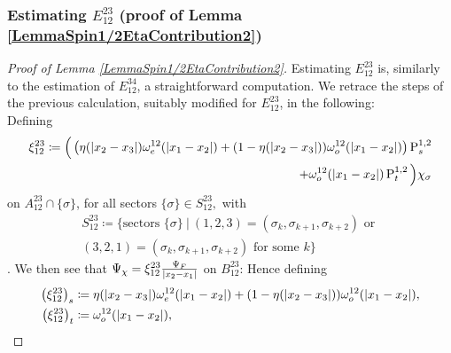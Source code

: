 \subsubsection{Estimating $ E_{12}^{23} $ (proof of Lemma \ref{LemmaSpin1/2EtaContribution2})}
\begin{proof}[Proof of Lemma \ref{LemmaSpin1/2EtaContribution2}]
Estimating $ E_{12}^{23} $ is, similarly to the estimation of $ E_{12}^{34} $, a straightforward computation. We retrace the steps of the previous calculation, suitably modified for $ E_{12}^{23} $, in the following:\\
Defining 
\begin{equation}
	\begin{aligned}
	\xi_{12}^{23}\coloneqq \Big(\left(\eta(\left\lvert x_2-x_3 \right\rvert)\omega^{12}_e(\left\lvert x_1-x_2 \right\rvert)+(1-\eta(\left\lvert x_2-x_3 \right\rvert))\omega^{12}_o(\left\lvert x_1-x_2 \right\rvert)\right)\operatorname{P}_s^{1,2}\\+\omega_o^{12}(\left\lvert x_1-x_2 \right\rvert)\operatorname{P}_t^{1,2}\Big)\chi_\sigma 
	\end{aligned}
\end{equation} 
on $ A_{12}^{23}\cap \{\sigma\}$, for all sectors $ \{\sigma\}\in S_{12}^{23}, $ 
with \begin{equation}
	\begin{aligned}
	S_{12}^{23}\coloneqq\big\{\text{sectors } \{\sigma\}\ \vert \ (1,2,3)=(\sigma_k,\sigma_{k+1},\sigma_{k+2}) \text{ or }\\ (3,2,1)=(\sigma_k,\sigma_{k+1},\sigma_{k+2}) \text{ for some } k\big\}
	\end{aligned}
\end{equation}. We then see that $\Psi_{\chi}=\xi_{12}^{23} \frac{\Psi_F}{\left\lvert x_2-x_1 \right\rvert}$ on $ B_{12}^{23} $: Hence defining \begin{equation}
	\begin{aligned}
	\left(\xi_{12}^{23}\right)_s&\coloneqq \eta(\left\lvert x_2-x_3 \right\rvert)\omega^{12}_e(\left\lvert x_1-x_2 \right\rvert)+(1-\eta(\left\lvert x_2-x_3 \right\rvert))\omega^{12}_o(\left\lvert x_1-x_2 \right\rvert),\\
	\left(\xi_{12}^{23}\right)_t&\coloneqq \omega_o^{12}(\left\lvert x_1-x_2 \right\rvert),
	\end{aligned}
\end{equation}


\end{proof}
